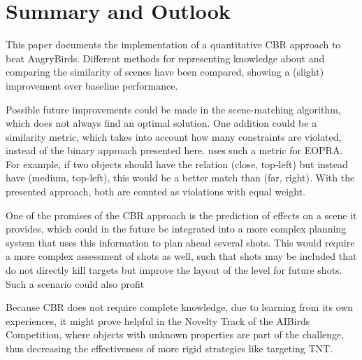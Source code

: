 \section{Summary and Outlook}\label{sec:outlook}
This paper documents the implementation of a quantitative \ac{CBR} approach to beat AngryBirds. 
Different methods for representing knowledge about and comparing the similarity of scenes have been compared, showing a (slight) improvement over baseline performance.

Possible future improvements could be made in the scene-matching algorithm, which does not always find an optimal solution.
One addition could be a similarity metric, which takes into account how many constraints are violated, instead of the binary approach presented here.
\cite{QCBR} uses such a metric for \ac{EOPRA}. For example, if two objects should have the relation (close, top-left) but instead have (medium, top-left), this would be a better match than (far, right). With the presented approach, both are counted as violations with equal weight.

One of the promises of the \ac{CBR} approach is the prediction of effects on a scene it provides, which could in the future be integrated into a more complex planning system that uses this information to plan ahead several shots.
This would require a more complex assessment of shots as well, such that shots may be included that do not directly kill targets but improve the layout of the level for future shots. Such a scenario could also profit

Because \ac{CBR} does not require complete knowledge, due to learning from its own experiences, it might prove helpful in the Novelty Track of the AIBirds Competition, where objects with unknown properties are part of the challenge, thus decreasing the effectiveness of more rigid strategies like targeting TNT.
